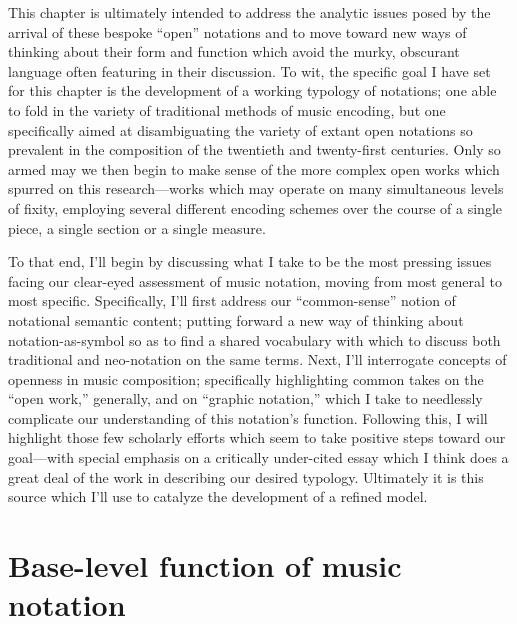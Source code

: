     This chapter is ultimately intended to address the analytic issues posed by the arrival of these bespoke ``open'' notations and to move toward new ways of thinking about their form and function which avoid the murky, obscurant language often featuring in their discussion. To wit, the specific goal I have set for this chapter is the development of a working typology of notations; one able to fold in the variety of traditional methods of music encoding, but one specifically aimed at disambiguating the variety of extant open notations so prevalent in the composition of the twentieth and twenty-first centuries. Only so armed may we then begin to make sense of the more complex open works which spurred on this research---works which may operate on many simultaneous levels of fixity, employing several different encoding schemes over the course of a single piece, a single section or a single measure.

    To that end, I'll begin by discussing what I take to be the most pressing issues facing our clear-eyed assessment of music notation, moving from most general to most specific. Specifically, I'll first address our ``common-sense'' notion of notational semantic content; putting forward a new way of thinking about notation-as-symbol so as to find a shared vocabulary with which to discuss both traditional and neo-notation on the same terms. Next, I'll interrogate concepts of openness in music composition; specifically highlighting common takes on the ``open work,'' generally, and on ``graphic notation,'' which I take to needlessly complicate our understanding of this notation's function. Following this, I will highlight those few scholarly efforts which seem to take positive steps toward our goal---with special emphasis on a critically under-cited essay which I think does a great deal of the work in describing our desired typology. Ultimately it is this source which I'll use to catalyze the development of a refined model.


\section{Base-level function of music notation}

